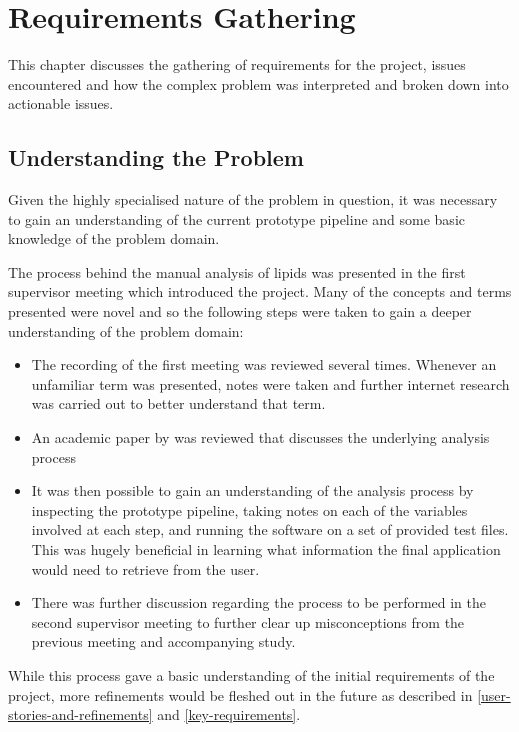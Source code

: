 \documentclass{l4proj}
\begin{document}
\chapter{Requirements Gathering}\label{requirements-gathering}
This chapter discusses the gathering of requirements for the project, issues encountered and how the complex problem was interpreted and broken down into actionable issues.

\section{Understanding the Problem}
Given the highly specialised nature of the problem in question, it was necessary to gain an understanding of the current prototype pipeline and some basic knowledge of the problem domain.

The process behind the manual analysis of lipids was presented in the first supervisor meeting which introduced the project. Many of the concepts and terms presented were novel and so the following steps were taken to gain a deeper understanding of the problem domain:

\begin{itemize}
    \item The recording of the first meeting was reviewed several times. Whenever an unfamiliar term was presented, notes were taken and further internet research was carried out to better understand that term.
    \item An academic paper by \cite{goh} was reviewed that discusses the underlying analysis process
    \item It was then possible to gain an understanding of the analysis process by inspecting the prototype pipeline, taking notes on each of the variables involved at each step, and running the software on a set of provided test files. This was hugely beneficial in learning what information the final application would need to retrieve from the user.
    \item There was further discussion regarding the process to be performed in the second supervisor meeting to further clear up misconceptions from the previous meeting and accompanying study.
\end{itemize}

While this process gave a basic understanding of the initial requirements of the project, more refinements would be fleshed out in the future as described in \ref{user-stories-and-refinements} and \ref{key-requirements}.
\end{document}
